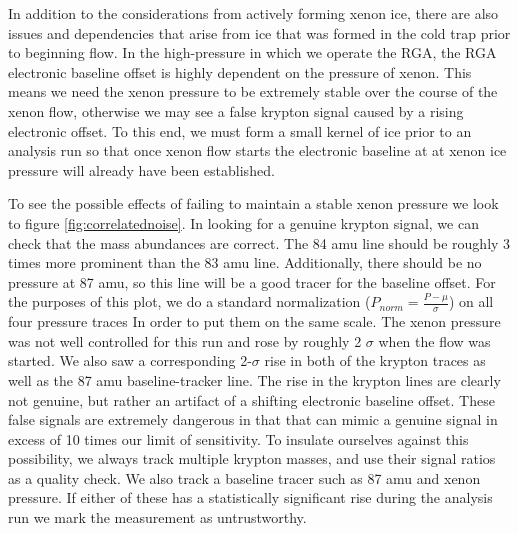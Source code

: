 In addition to the considerations from actively forming xenon ice, there are also issues and dependencies that arise from ice that was formed in the cold trap prior to beginning flow. In the high-pressure in which we operate the RGA, the RGA electronic baseline offset is highly dependent on the pressure of xenon. This means we need the xenon pressure to be extremely stable over the course of the xenon flow, otherwise we may see a false krypton signal caused by a rising electronic offset. To this end, we must form a small kernel of ice prior to an analysis run so that once xenon flow starts the electronic baseline at at xenon ice pressure will already have been established. 

To see the possible effects of failing to maintain a stable xenon pressure we look to figure \ref{fig:correlatednoise}. In looking for a genuine krypton signal, we can check that the mass abundances are correct. The 84 amu line should be roughly 3 times more prominent than the 83 amu line. Additionally, there should be no pressure at 87 amu, so this line will be a good tracer for the baseline offset. For the purposes of this plot, we do a standard normalization ($P_{norm}=\frac{P-\mu}{\sigma}$) on all four pressure traces In order to put them on the same scale. The xenon pressure was not well controlled for this run and rose by roughly 2 $\sigma$ when the flow was started. We also saw a corresponding 2-$\sigma$ rise in both of the krypton traces as well as the 87 amu baseline-tracker line. The rise in the krypton lines are clearly not genuine, but rather an artifact of a shifting electronic baseline offset. These false signals are extremely dangerous in that that can mimic a genuine signal in excess of 10 times our limit of sensitivity. To insulate ourselves against this possibility, we always track multiple krypton masses, and use their signal ratios as a quality check. We also track a baseline tracer such as 87 amu and xenon pressure. If either of these has a statistically significant rise during the analysis run we mark the measurement as untrustworthy.
